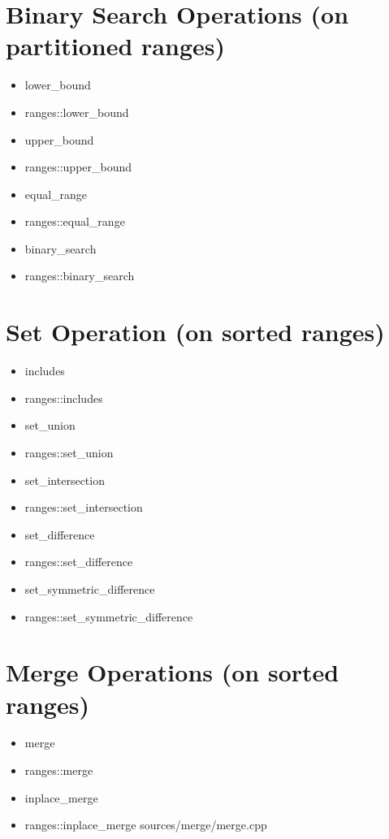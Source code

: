 \documentclass{article}
\begin{document}
\section{Binary Search Operations (on partitioned ranges)}
    \begin{itemize}
      \item lower\_bound
      \item ranges::lower\_bound
      \item upper\_bound
      \item ranges::upper\_bound
      \item equal\_range
      \item ranges::equal\_range
      \item binary\_search
      \item ranges::binary\_search
    \end{itemize}
\section{Set Operation (on sorted ranges)}
    \begin{itemize}
      \item includes
      \item ranges::includes
      \item set\_union
      \item ranges::set\_union
      \item set\_intersection
      \item ranges::set\_intersection
      \item set\_difference
      \item ranges::set\_difference
      \item set\_symmetric\_difference
      \item ranges::set\_symmetric\_difference
    \end{itemize}
\section{Merge Operations (on sorted ranges)}
    \begin{itemize}
      \item merge
      \item ranges::merge
      \item inplace\_merge
      \item ranges::inplace\_merge
         {sources/merge/merge.cpp}
    \end{itemize}
\end{document}
